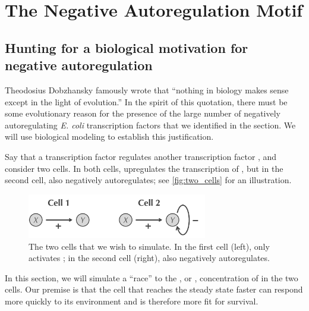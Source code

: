 \FloatBarrier
{}

\section{The Negative Autoregulation Motif}
\label{sec:the_negative_autoregulation_motif}

\subsection{Hunting for a biological motivation for negative autoregulation}

Theodosius Dobzhansky famously wrote that ``nothing in biology makes sense except in the light of evolution.'' In the spirit of this quotation, there must be some evolutionary reason for the presence of the large number of negatively autoregulating \textit{E. coli} transcription factors that we identified in the section. We will use biological modeling to establish this justification.

Say that a transcription factor  regulates another transcription factor , and consider two cells. In both cells,  upregulates the transcription of , but in the second cell,  also negatively autoregulates; see \autoref{fig:two_cells} for an illustration.\\

\begin{figure}[h]
\centering
\mySfFamily
\includegraphics[width = 0.7\textwidth]{../images/two_cells.png}
\caption{The two cells that we wish to simulate. In the first cell (left),  only activates ; in the second cell (right),  also negatively autoregulates.}
\label{fig:two_cells}
\end{figure}

In this section, we will simulate a ``race'' to the , or , concentration of  in the two cells. Our premise is that the cell that reaches the steady state faster can respond more quickly to its environment and is therefore more fit for survival.

\FloatBarrier
{}
